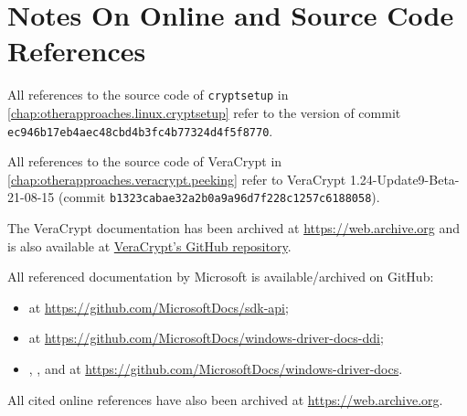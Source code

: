 \chapter{Notes On Online and Source Code References}
\label{app:onlinereferences}
All references to the source code of \texttt{cryptsetup} in \autoref{chap:otherapproaches.linux.cryptsetup} refer to the version of commit \texttt{ec946b17eb4aec48cbd4b3fc4b77324d4f5f8770}.

All references to the source code of VeraCrypt in \autoref{chap:otherapproaches.veracrypt.peeking} refer to VeraCrypt 1.24-Update9-Beta-21-08-15 (commit \texttt{b1323cabae32a2b0a9a96d7f228c1257c6188058}).

The VeraCrypt documentation \cite{Veracrypt} has been archived at \url{https://web.archive.org} and is also available at \href{https://github.com/veracrypt/VeraCrypt}{VeraCrypt's GitHub repository}.

All referenced documentation by Microsoft is available/archived on GitHub:
\begin{itemize}
	\item \cite{Win32} at \url{https://github.com/MicrosoftDocs/sdk-api};
	\item \cite{Wdk} at \url{https://github.com/MicrosoftDocs/windows-driver-docs-ddi};
	\item \cite{Wdf}, \cite{Fltmgr}, and \cite{Kerneldriver} at \url{https://github.com/MicrosoftDocs/windows-driver-docs}.
\end{itemize}

All cited online references have also been archived at \url{https://web.archive.org}.


